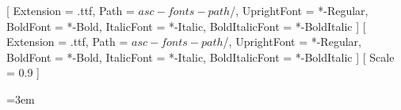 %
%

\usepackage[strings]{underscore}

\usepackage{xcolor}

\usepackage{fontspec}
\setmainfont{IBMPlexSerif}[
  Extension = .ttf,
  Path = {$asc-fonts-path$/},
  UprightFont = *-Regular,
  BoldFont = *-Bold,
  ItalicFont = *-Italic,
  BoldItalicFont = *-BoldItalic
]
\setsansfont{IBMPlexSans}[
  Extension = .ttf,
  Path = {$asc-fonts-path$/},
  UprightFont = *-Regular,
  BoldFont = *-Bold,
  ItalicFont = *-Italic,
  BoldItalicFont = *-BoldItalic
]
\setmonofont{IBM Plex Mono}[
  Scale = 0.9
]


\usepackage[hyphens]{url}
\usepackage{hyperref}
\hypersetup{
  colorlinks = true,
  linkcolor  = accent,
  urlcolor   = accent,
  citecolor  = burnt-umber,
  filecolor  = accent,
  breaklinks = true
}

\sloppy
\emergencystretch=3em
\setlength{\hfuzz}{2pt}
\expandafter\def\expandafter\UrlBreaks\expandafter{\UrlBreaks\do\/\do\-\do\_\do\.\do\:\do\=\do\?\do\&\do\#}
\expandafter\def\expandafter\UrlBigBreaks\expandafter{\UrlBigBreaks\do\/\do\-}

